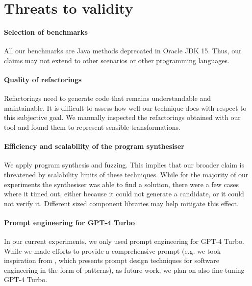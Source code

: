 \documentclass[sigconf,review,anonymous]{acmart}
\begin{document}
\section{Threats to validity}

\paragraph{Selection of benchmarks}
All our benchmarks are Java methods deprecated in Oracle JDK 15. %
Thus, our claims may not extend to other scenarios or other programming languages.

\paragraph{Quality of refactorings} Refactorings need to generate code that
remains understandable and maintainable. It is difficult to assess how well our technique does with respect to
this subjective goal.  %
We manually inspected the refactorings obtained with
our tool and found them to represent sensible transformations.

\paragraph{Efficiency and scalability of the program synthesiser}
We apply program synthesis and fuzzing. 
This implies that our broader claim is threatened by scalability limits of these techniques.
While for the majority of our experiments the synthesiser was able to find a solution, there were a few cases
where it timed out, either because it could not generate a candidate, or it could not verify it.
Different sized component libraries may help mitigate this effect.

\paragraph{Prompt engineering for GPT-4 Turbo}
In our current experiments, we only used prompt engineering for GPT-4 Turbo.
While we made efforts to provide a comprehensive prompt (e.g. we took inspiration from \cite{white2023chatgpt}, which
presents prompt design techniques for software engineering in the form of patterns), as future work, we plan on also fine-tuning GPT-4 Turbo. 
\end{document}
